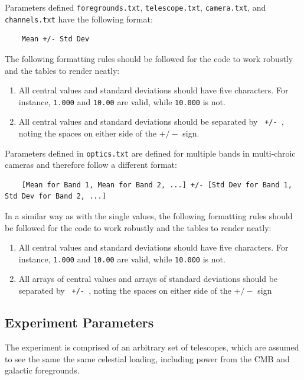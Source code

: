 \documentclass[11pt]{article} %
\begin{document}
Parameters defined \texttt{foregrounds.txt}, \texttt{telescope.txt}, \texttt{camera.txt}, and \texttt{channels.txt} have the following format:

\begin{lstlisting}
	Mean +/- Std Dev
\end{lstlisting}

The following formatting rules should be followed for the code to work robustly and the tables to render neatly:

\begin{enumerate}
	\item All central values and standard deviations should have five characters. For instance, \texttt{1.000} and \texttt{10.00} are valid, while \texttt{10.000} is not.
	\item All central values and standard deviations should be separated by  \texttt{ +/- }, noting the spaces on either side of the $+/-$ sign.
\end{enumerate}

Parameters defined in \texttt{optics.txt} are defined for multiple bands in multi-chroic cameras and therefore follow a different format:

\begin{lstlisting}
	[Mean for Band 1, Mean for Band 2, ...] +/- [Std Dev for Band 1, Std Dev for Band 2, ...]
\end{lstlisting}

In a similar way as with the single values, the following formatting rules should be followed for the code to work robustly and the tables to render neatly:

\begin{enumerate}
	\item All central values and standard deviations should have five characters. For instance, \texttt{1.000} and \texttt{10.00} are valid, while \texttt{10.000} is not.
	\item All arrays of central values and arrays of standard deviations should be separated by  \texttt{ +/- }, noting the spaces on either side of the $+/-$ sign
\end{enumerate}


\subsection{Experiment Parameters}

The experiment is comprised of an arbitrary set of telescopes, which are assumed to see the same the same celestial loading, including power from the CMB and galactic foregrounds.
\end{document}
